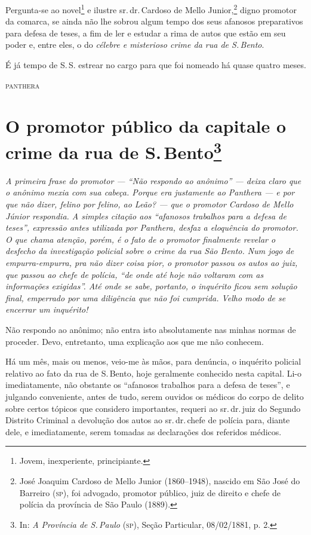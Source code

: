 Pergunta-se ao novel\footnote{Jovem, inexperiente, principiante.} e
ilustre sr.\,dr.\,Cardoso de Mello Junior,\footnote{José Joaquim Cardoso \label{jjcmj}
  de Mello Junior (1860--1948), nascido em São José do Barreiro (\textsc{sp}), foi
  advogado, promotor público, juiz de direito e chefe de polícia da
  província de São Paulo (1889).}
digno promotor da comarca,
se ainda não lhe sobrou algum tempo dos seus afanosos preparativos para
defesa de teses, a fim de ler e estudar a rima de autos que estão em seu
poder e, entre eles, o do \emph{célebre e misterioso crime da rua de S.\,Bento}.

É já tempo de S.\,S. estrear no cargo para que foi nomeado há quase
quatro meses.

\hfill\textsc{panthera}

\pagebreak
\section{O promotor público da capital\break e o crime da rua de S.\,Bento\protect\footnote{\MakeUppercase{I}n: \emph{\MakeUppercase{A} \MakeUppercase{P}rovíncia de \MakeUppercase{S.\,P}aulo} (\textsc{sp}), \MakeUppercase{S}eção \MakeUppercase{P}articular, 08/02/1881, p. 2.}}

\begin{resumo}
\emph{A primeira frase do promotor --- ``Não respondo ao anônimo'' --- deixa
claro que o anônimo mexia com sua cabeça. Porque era justamente ao
Panthera --- e por que não dizer, felino por felino, ao
Leão? --- que o promotor Cardoso de Mello Júnior respondia. A
simples citação aos ``afanosos trabalhos para a defesa de teses'',
expressão antes utilizada por Panthera, desfaz a eloquência do
promotor. O que chama atenção, porém, é o fato de o promotor finalmente
revelar o desfecho da investigação policial sobre o crime da rua São
Bento. Num jogo de empurra-empurra, pra não dizer coisa pior, o promotor
passou os autos ao juiz, que passou ao chefe de polícia, ``de onde até
hoje não voltaram com as informações exigidas''. Até onde se sabe,
portanto, o inquérito ficou sem solução final, emperrado por uma
diligência que não foi cumprida. Velho modo de se encerrar um
inquérito!}
\end{resumo}

Não respondo ao anônimo; não entra isto absolutamente nas minhas normas
de proceder. Devo, entretanto, uma explicação aos que me não conhecem.

Há um mês, mais ou menos, veio-me às mãos, para denúncia, o inquérito
policial relativo ao fato da rua de S.\,Bento, hoje geralmente conhecido
nesta capital. Li-o imediatamente, não obstante os ``afanosos trabalhos
para a defesa de teses'', e julgando conveniente, antes de tudo, serem
ouvidos os médicos do corpo de delito sobre certos tópicos que considero
importantes, requeri ao sr.\,dr.\,juiz do Segundo Distrito Criminal a
devolução dos autos ao sr.\,dr.\,chefe de polícia para, diante dele, e
imediatamente, serem tomadas as declarações dos referidos médicos.


